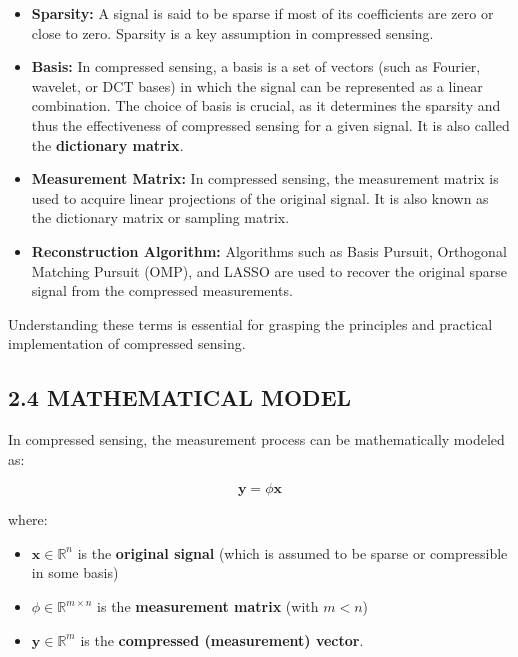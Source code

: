 \documentclass[
  letterpaper,
  DIV=11,
  numbers=noendperiod]{scrartcl}
\providecommand{\tightlist}{%
  \setlength{\itemsep}{0pt}\setlength{\parskip}{0pt}}
\begin{document}
\begin{itemize}
\tightlist
\item
  \textbf{Sparsity:} A signal is said to be sparse if most of its
  coefficients are zero or close to zero. Sparsity is a key assumption
  in compressed sensing.
\item
  \textbf{Basis:} In compressed sensing, a basis is a set of vectors
  (such as Fourier, wavelet, or DCT bases) in which the signal can be
  represented as a linear combination. The choice of basis is crucial,
  as it determines the sparsity and thus the effectiveness of compressed
  sensing for a given signal. It is also called the \textbf{dictionary
  matrix}.
\item
  \textbf{Measurement Matrix:} In compressed sensing, the measurement
  matrix is used to acquire linear projections of the original signal.
  It is also known as the dictionary matrix or sampling matrix.
\item
  \textbf{Reconstruction Algorithm:} Algorithms such as Basis Pursuit,
  Orthogonal Matching Pursuit (OMP), and LASSO are used to recover the
  original sparse signal from the compressed measurements.
\end{itemize}

Understanding these terms is essential for grasping the principles and
practical implementation of compressed sensing.

\subsection{2.4 MATHEMATICAL MODEL}\label{mathematical-model}

In compressed sensing, the measurement process can be mathematically
modeled as:

\begin{equation}
  \mathbf{y} = \phi \mathbf{x}
\end{equation}

where:

\begin{itemize}
\tightlist
\item
  \(\mathbf{x} \in \mathbb{R}^n\) is the \textbf{original signal} (which
  is assumed to be sparse or compressible in some basis)
\item
  \(\phi \in \mathbb{R}^{m \times n}\) is the \textbf{measurement
  matrix} (with \(m < n\))
\item
  \(\mathbf{y} \in \mathbb{R}^m\) is the \textbf{compressed
  (measurement) vector}.
\end{itemize}
\end{document}
